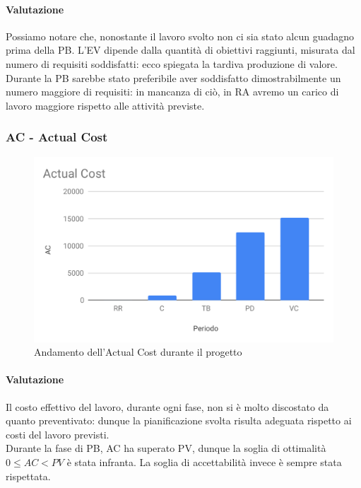 \paragraph*{Valutazione}
Possiamo notare che, nonostante il lavoro svolto non ci sia stato alcun guadagno prima della PB. L'EV dipende dalla quantità di obiettivi raggiunti, misurata dal numero di requisiti soddisfatti: ecco spiegata la tardiva produzione di valore.\\
Durante la PB sarebbe stato preferibile aver soddisfatto dimostrabilmente un numero maggiore di requisiti: in mancanza di ciò, in RA avremo un carico di lavoro maggiore rispetto alle attività previste. 

\subsubsection{AC - Actual Cost}
\begin{figure}[H]
	\centering
	\includegraphics[scale=0.7]{res/images/RA/ac.pdf}
	\caption{Andamento dell'Actual Cost durante il progetto}
\end{figure}
\paragraph*{Valutazione}
Il costo effettivo del lavoro, durante ogni fase, non si è molto discostato da quanto preventivato: dunque la pianificazione svolta risulta adeguata rispetto ai costi del lavoro previsti. \\
Durante la fase di PB, AC ha superato PV, dunque la soglia di ottimalità $0 \leq AC < PV$ è stata infranta. La soglia di accettabilità invece è sempre stata rispettata.

